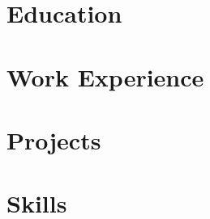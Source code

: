 \documentclass[letterpaper,10pt]{article}
\begin{document}


\section{Education}
  \resumeSubHeadingListStart
  
  \resumeSubHeadingListEnd

\section{Work Experience}
  \resumeSubHeadingListStart
  	
  \resumeSubHeadingListEnd

\section{{Projects}}
  \resumeSubHeadingListStart
    
  \resumeSubHeadingListEnd
  
\section{Skills}
  \resumeSubHeadingListStart 
  
  \resumeSubHeadingListEnd

\end{document}
